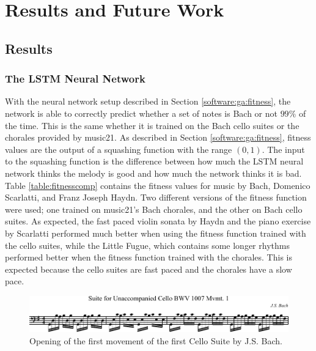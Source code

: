 \chapter{Results and Future Work} \label{results_future}

\section{Results} \label{results}


\subsection{The LSTM Neural Network}

With the neural network setup described in Section \ref{software:ga:fitness}, the network is able to correctly predict whether a set of notes is Bach or not $99\%$ of the time.
This is the same whether it is trained on the Bach cello suites or the chorales provided by music21.
As described in Section \ref{software:ga:fitness}, fitness values are the output of a squashing function with the range $(0,1)$.
The input to the squashing function is the difference between how much the LSTM neural network thinks the melody is good and how much the network thinks it is bad.
Table \ref{table:fitnesscomp} contains the fitness values for music by Bach, Domenico Scarlatti, and Franz Joseph Haydn.
Two different versions of the fitness function were used; one trained on music21's Bach chorales, and the other on Bach cello suites.
As expected, the fast paced violin sonata by Haydn and the piano exercise by Scarlatti performed much better when using the fitness function trained with the cello suites, while the Little Fugue, which contains some longer rhythms performed better when the fitness function trained with the chorales.
This is expected because the cello suites are fast paced and the chorales have a slow pace.

\begin{figure}[]
	\centering
	\includegraphics[width=\linewidth]{figures/cello_suite.pdf}
	\caption{Opening of the first movement of the first Cello Suite by J.S. Bach.}
	\label{fig:music:cello_suite}
\end{figure}

